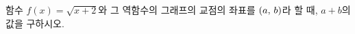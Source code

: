 \hspace*{2mm}\begin{minipage}[t]{\dimexpr\linewidth-2mm\relax}\vspace{0pt}
함수 $f(x)=\sqrt{x+2}$와 그 역함수의 그래프의 교점의 좌표를 $(a,\mkern3mu b)$라 할 때, $a+b$의 값을 구하시오.\end{minipage}
